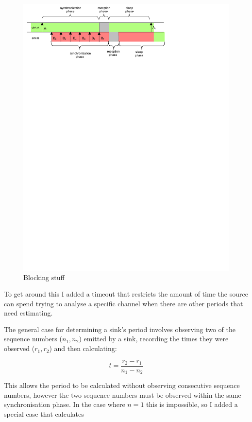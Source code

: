 \documentclass{article}
\begin{document}
\begin{figure}[h]
\includegraphics[trim=1cm 22cm 1cm 1cm]{embs-blocking}
\caption{Blocking stuff}
\label{fig:long-blocking}
\end{figure}



To get around this I added a timeout that restricts the amount of time the source can spend trying to analyse a specific
channel when there are other periods that need estimating.

The general case for determining a sink's period involves observing two of the sequence numbers ($n_1, n_2$) emitted by a sink,
recording the times they were observed ($r_1, r_2$) and then calculating:

$$t = \frac{r_2 - r_1} {n_1 - n_2}$$

This allows the period to be calculated without observing consecutive sequence numbers, however the two
sequence numbers must be observed within the same synchronisation phase. In the case where $n=1$ this is impossible,
so I added a special case that calculates
\end{document}
